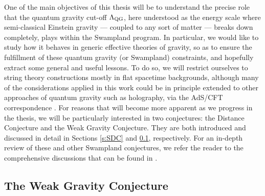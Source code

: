 One of the main objectives of this thesis will be to understand the precise role that the quantum gravity cut-off $\Lambda_{\text{QG}}$, here understood as the energy scale where semi-classical Einstein gravity --- coupled to any sort of matter --- breaks down completely, plays within the Swampland program. In particular, we would like to study how it behaves in generic effective theories of gravity, so as to ensure the fulfillment of these quantum gravity (or Swampland) constraints, and hopefully extract some general and useful lessons. To do so, we will restrict ourselves to string theory constructions mostly in flat spacetime backgrounds, although many of the considerations applied in this work could be in principle extended to other approaches of quantum gravity such as holography, via the AdS/CFT correspondence  \cite{Maldacena:1997re,Witten:1998qj}. For reasons that will become more apparent as we progress in the thesis, we will be particularly interested in two conjectures: the Distance Conjecture and the Weak Gravity Conjecture. They are both introduced and discussed in detail in Sections \ref{s:SDC} and \ref{s:WGC}, respectively. For an in-depth review of these and other Swampland conjectures, we refer the reader to the comprehensive discussions that can be found in \cite{Brennan:2017rbf,Palti:2019pca,vanBeest:2021lhn,Grana:2021zvf,Harlow:2022gzl,Agmon:2022thq,VanRiet:2023pnx}.

\subsection{The Weak Gravity Conjecture}\label{s:WGC}


